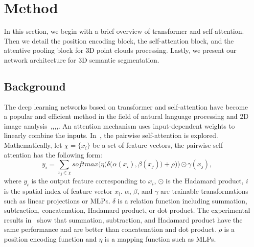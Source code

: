 \documentclass[review]{elsarticle}
\begin{document}
\section{Method}
In this section, we begin with a brief overview of transformer and self-attention. Then we detail the position encoding block, the self-attention block, and the attentive pooling block for 3D point clouds processing. Lastly, we present our network architecture for 3D semantic segmentation.

\subsection{\textbf{Background}}\label{sec:Bg}
 The deep learning networks based on transformer and self-attention have become a popular and efficient method in the field of natural language processing and 2D image analysis~\cite{vaswani2017attention},\cite{wu2019pay},\cite{hu2019local},\cite{ramachandran2019stand},\cite{Zhao_2020_CVPR}. An attention mechanism uses input-dependent weights to linearly combine the inputs. In~\cite{Zhao_2020_CVPR}, the pairwise self-attention is explored. Mathematically, let $ \chi = \{x_i\}$ be a set of feature vectors, the pairwise self-attention has the following form:
\begin{equation}
	\label{eq:ps}
	  y_i =  \sum\limits_{x_j \in \chi} softmax\bigg(\eta\Big(\delta\big(\alpha(x_i),\beta(x_j)\big)+ \rho\Big)\bigg) \odot \gamma(x_j),
\end{equation}
where $y_i$ is the output feature corresponding to $x_i$, $\odot$ is the Hadamard product, $i$ is the spatial index of feature vector $x_i$. $\alpha$, $\beta$, and $\gamma$ are trainable transformations such as linear projections or MLPs. $\delta$ is a relation function including summation, subtraction, concatenation, Hadamard product, or dot product. The experimental results in~\cite{Zhao_2020_CVPR} show that summation, subtraction, and Hadamard product have the same performance and are better than concatenation and dot product. $\rho$ is a position encoding function and $\eta$ is a mapping function such as MLPs.
\end{document}
